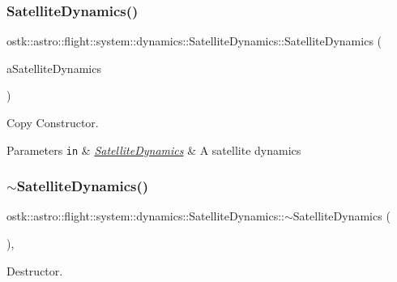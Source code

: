 \subsubsection{\texorpdfstring{Satellite\+Dynamics()}{SatelliteDynamics()}\hspace{0.1cm}{\footnotesize\ttfamily [2/2]}}
{\footnotesize\ttfamily ostk\+::astro\+::flight\+::system\+::dynamics\+::\+Satellite\+Dynamics\+::\+Satellite\+Dynamics (\begin{DoxyParamCaption}\item[{const \hyperlink{classostk_1_1astro_1_1flight_1_1system_1_1dynamics_1_1_satellite_dynamics}{Satellite\+Dynamics} \&}]{a\+Satellite\+Dynamics }\end{DoxyParamCaption})}



Copy Constructor. 


\begin{DoxyParams}[1]{Parameters}
\mbox{\tt in}  & {\em \hyperlink{classostk_1_1astro_1_1flight_1_1system_1_1dynamics_1_1_satellite_dynamics}{Satellite\+Dynamics}} & A satellite dynamics \\
\hline
\end{DoxyParams}
\mbox{\label{classostk_1_1astro_1_1flight_1_1system_1_1dynamics_1_1_satellite_dynamics_a19f580468419341d3754707917aa835a}} 
\subsubsection{\texorpdfstring{$\sim$\+Satellite\+Dynamics()}{~SatelliteDynamics()}}
{\footnotesize\ttfamily ostk\+::astro\+::flight\+::system\+::dynamics\+::\+Satellite\+Dynamics\+::$\sim$\+Satellite\+Dynamics (\begin{DoxyParamCaption}{ }\end{DoxyParamCaption})\hspace{0.3cm}{\ttfamily [override]}, {\ttfamily [virtual]}}



Destructor. 



